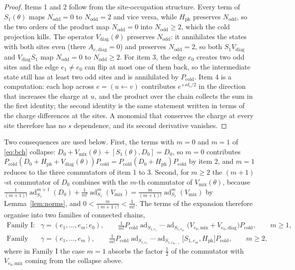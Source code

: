 \documentclass[11pt]{article}
\theoremstyle{plain}
\theoremstyle{definition}
\newcommand{\Nodd}{N_{\mathrm{odd}}}
\newcommand{\ad}{\operatorname{ad}}
\begin{document}
\begin{proof}
Items 1 and 2 follow from the site-occupation structure. Every term of
$S_1(\theta)$ maps $\Nodd=0$ to $\Nodd=2$ and vice versa, while $H_{\mathrm{ph}}$
preserves $\Nodd$, so the two orders of the product map $\Nodd=0$ into
$\Nodd\ge2$, which the cold projection kills. The operator
$V_{\mathrm{diag}}(\theta)$ preserves $\Nodd$: it annihilates the states with both
sites even (there $A_{e,\mathrm{diag}}=0$) and preserves $\Nodd=2$, so both
$S_{1}V_{\mathrm{diag}}$ and $V_{\mathrm{diag}}S_1$ map $\Nodd=0$ to
$\Nodd\ge2$. For item 3, the edge $e_0$ creates two odd sites and the edge
$e_1\ne e_0$ can flip at most one of them back, so the intermediate state still
has at least two odd sites and is annihilated by $P_{\mathrm{cold}}$. Item 4 is a
computation: each hop across $e=(u\leftarrow v)$ contributes $e^{+s\delta_e/2}$ in
the direction that increases the charge at $u$, and the product over the chain
collects the sum in the first identity; the second identity is the same statement
written in terms of the charge differences at the sites. A monomial that conserves
the charge at every site therefore has no $s$ dependence, and its second
derivative vanishes.
\end{proof}

Two consequences are used below. First, the terms with $m=0$ and $m=1$ of
\eqref{eq:bch} collapse: $D_0+V_{\mathrm{mix}}(\theta)+[S_1(\theta),D_0]=D_0$, so
$m=0$ contributes $P_{\mathrm{cold}}(D_0+H_{\mathrm{ph}}+V_{\mathrm{diag}}(\theta))P_{\mathrm{cold}}
=P_{\mathrm{cold}}(D_0+H_{\mathrm{ph}})P_{\mathrm{cold}}$ by item 2, and $m=1$
reduces to the three commutators of item 1 to 3. Second, for $m\ge2$ the
$(m+1)$-st commutator of $D_0$ combines with the $m$-th commutator of
$V_{\mathrm{mix}}(\theta)$, because
$\frac{1}{(m+1)!}\ad^{m+1}_{S_1}(D_0)+\frac{1}{m!}\ad^{m}_{S_1}(V_{\mathrm{mix}})
=\frac{m}{(m+1)!}\ad_{S_1}^{m}(V_{\mathrm{mix}})$ by
Lemma~\ref{lem:norms}, and $0<\frac{m}{(m+1)!}<\frac{1}{m!}$. The terms of the
expansion therefore organise into two families of connected chains,
\begin{align}
\text{Family I:}\quad &\gamma=(e_1,\dots,e_m;e_0),\qquad
\frac{1}{m!}P_{\mathrm{cold}}\ad_{S_{1,e_1}}\cdots\ad_{S_{1,e_m}}
\bigl(V_{e_0,\mathrm{mix}}+V_{e_0,\mathrm{diag}}\bigr)P_{\mathrm{cold}},
\qquad m\ge1,
\label{eq:famI}\\
\text{Family II:}\quad &\gamma=(e_1,\dots,e_m),\qquad
\frac{1}{m!}P_{\mathrm{cold}}\ad_{S_{1,e_1}}\cdots\ad_{S_{1,e_{m-1}}}
\bigl[S_{1,e_m},H_{\mathrm{ph}}\bigr]P_{\mathrm{cold}},\qquad m\ge2,
\label{eq:famII}
\end{align}
where in Family I the case $m=1$ absorbs the factor $\tfrac{1}{2}$ of the
commutator with $V_{e_0,\mathrm{mix}}$ coming from the collapse above.
\end{document}
